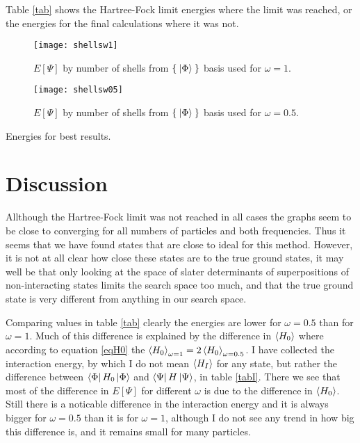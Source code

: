 \documentclass[a4paper,english,12pt]{article}
\begin{document}
Table \ref{tab} shows the Hartree-Fock limit energies where the limit was reached, or the energies for the final calculations where it was not.



\begin{figure}
  \begin{center}
    \texttt{[image: shellsw1]}
  \end{center}
  \caption{$E[\Psi]$ by number of shells from \(\Set{\Ket{\Phi}}\) basis used for $\omega=1$.}\label{figshellsw1}
\end{figure}

\begin{figure}
  \begin{center}
    \texttt{[image: shellsw05]}
  \end{center}
  \caption{$E[\Psi]$ by number of shells from \(\Set{\Ket{\Phi}}\) basis used for $\omega=0.5$.}\label{figshellsw05}
\end{figure}




\begin{table}
  \caption{Energies for best results.}
  \label{tab}
  \begin{center}
    
  \end{center}
\end{table}


\section{Discussion}
Allthough the Hartree-Fock limit was not reached in all cases the graphs seem to be close to converging for all numbers of particles
and both frequencies. Thus it seems that we have found states that are close to ideal for this method. However, it is not at all clear how close these
states are to the true ground states, it may well be that only looking at the space of slater determinants of superpositions of non-interacting states
limits the search space too much, and that the true ground state is very different from anything in our search space.

Comparing values in table \ref{tab} clearly the energies are lower for $\omega = 0.5$ than for $\omega = 1$. Much of this difference is explained by
the difference in $\Braket{H_0}$ where according to equation \ref{eqH0} the \(\Braket{H_0}_{\omega = 1} = 2\Braket{H_0}_{\omega = 0.5}\).
I have collected the interaction energy, by which I do not mean $\Braket{H_I}$ for any state, but rather the difference between
$\Bra{\Phi}H_0\Ket{\Phi}$ and $\Bra{\Psi}H\Ket{\Psi}$, in table \ref{tabI}. There we see that most of the difference in $E[\Psi]$ for different $\omega$
is due to the difference
in $\Braket{H_0}$. 
Still there is a noticable difference in the interaction energy and it is always bigger for $\omega = 0.5$ than it is for
$\omega = 1$, although I do not see any trend in how big this difference is, and it remains small for many particles.
\end{document}
